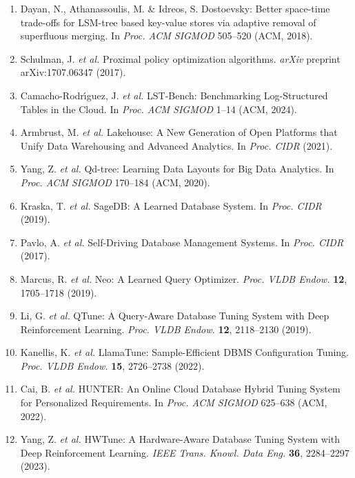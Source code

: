 \documentclass[fleqn,10pt]{wlscirep}
\begin{document}
\begin{enumerate}
\item Dayan, N., Athanassoulis, M. \& Idreos, S. Dostoevsky: Better
  space-time trade-offs for LSM-tree based key-value stores via adaptive
  removal of superfluous merging. In \textit{Proc. ACM SIGMOD} 505--520
  (ACM, 2018).

\item Schulman, J. \textit{et al.} Proximal policy optimization algorithms.
  \textit{arXiv} preprint arXiv:1707.06347 (2017).

\item Camacho-Rodr\'{\i}guez, J. \textit{et al.} LST-Bench: Benchmarking
  Log-Structured Tables in the Cloud. In \textit{Proc. ACM SIGMOD}
  1--14 (ACM, 2024).

\item Armbrust, M. \textit{et al.} Lakehouse: A New Generation of Open
  Platforms that Unify Data Warehousing and Advanced Analytics. In
  \textit{Proc. CIDR} (2021).

\item Yang, Z. \textit{et al.} Qd-tree: Learning Data Layouts for Big
  Data Analytics. In \textit{Proc. ACM SIGMOD} 170--184 (ACM, 2020).

\item Kraska, T. \textit{et al.} SageDB: A Learned Database System. In
  \textit{Proc. CIDR} (2019).

\item Pavlo, A. \textit{et al.} Self-Driving Database Management Systems.
  In \textit{Proc. CIDR} (2017).

\item Marcus, R. \textit{et al.} Neo: A Learned Query Optimizer.
  \textit{Proc. VLDB Endow.} \textbf{12}, 1705--1718 (2019).

\item Li, G. \textit{et al.} QTune: A Query-Aware Database Tuning System
  with Deep Reinforcement Learning. \textit{Proc. VLDB Endow.}
  \textbf{12}, 2118--2130 (2019).

\item Kanellis, K. \textit{et al.} LlamaTune: Sample-Efficient DBMS
  Configuration Tuning. \textit{Proc. VLDB Endow.} \textbf{15},
  2726--2738 (2022).

\item Cai, B. \textit{et al.} HUNTER: An Online Cloud Database Hybrid
  Tuning System for Personalized Requirements. In \textit{Proc. ACM
  SIGMOD} 625--638 (ACM, 2022).

\item Yang, Z. \textit{et al.} HWTune: A Hardware-Aware Database Tuning
  System with Deep Reinforcement Learning. \textit{IEEE Trans. Knowl.
  Data Eng.} \textbf{36}, 2284--2297 (2023).


\end{enumerate}
\end{document}
